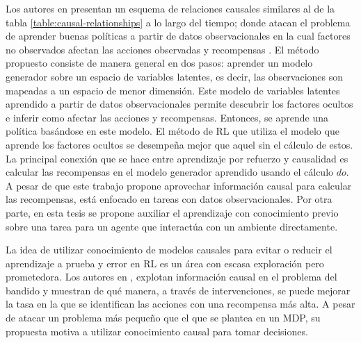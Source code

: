 Los autores en \cite{lu2018deconfounding} presentan un esquema de relaciones causales similares al de la tabla \ref{table:causal-relationships} a lo largo del tiempo; donde atacan el problema de aprender buenas políticas a partir de datos observacionales en la cual factores no observados afectan las acciones observadas y recompensas \cite{pearl_2009}. El método propuesto consiste de manera general en dos pasos: aprender un modelo generador \cite{jebara2012machine} sobre un espacio de variables latentes, es decir, las observaciones son mapeadas a un espacio de menor dimensión.  Este modelo de variables latentes aprendido a partir de datos observacionales permite descubrir los factores ocultos e inferir como afectar las acciones y recompensas. Entonces, se aprende una política basándose en este modelo. 
El método de RL que utiliza el modelo que aprende los factores ocultos se desempeña mejor que aquel sin el cálculo de estos. La principal conexión que se hace entre aprendizaje por refuerzo y causalidad es calcular las recompensas en el modelo generador aprendido usando el cálculo $do$. A pesar de que este trabajo propone aprovechar información causal para calcular las recompensas, está enfocado en tareas con datos observacionales. Por otra parte, en esta tesis se propone auxiliar el aprendizaje con conocimiento previo sobre una tarea para un agente que interactúa con un ambiente directamente.

La idea de utilizar conocimiento de modelos
causales para evitar o reducir el aprendizaje a 
prueba y error en RL es un área con escasa 
exploración pero prometedora.
Los autores en \cite{lattimore2016causal},
explotan información causal en el problema
del bandido y muestran de qué manera, a través
de intervenciones, se puede mejorar la
tasa en la que se identifican las acciones
con una recompensa más alta. A pesar de atacar un problema más pequeño
que el que se plantea en un MDP, su propuesta motiva a utilizar 
conocimiento causal para tomar decisiones.

